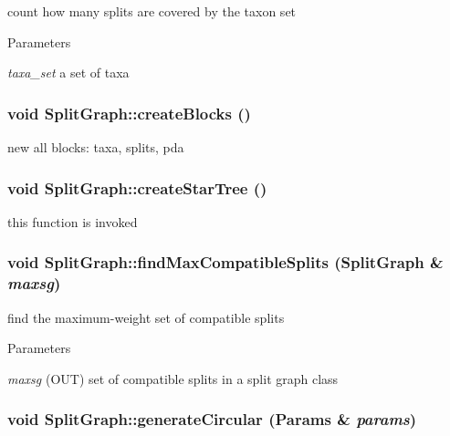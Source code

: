 count how many splits are covered by the taxon set 
\begin{DoxyParams}{Parameters}
\item[{\em taxa\_\-set}]a set of taxa \end{DoxyParams}
\hypertarget{classSplitGraph_a05d34dc9d03a3aed2e195b64acd698b0}{
\subsubsection[{createBlocks}]{\setlength{\rightskip}{0pt plus 5cm}void SplitGraph::createBlocks ()}}
\label{classSplitGraph_a05d34dc9d03a3aed2e195b64acd698b0}
new all blocks: taxa, splits, pda \hypertarget{classSplitGraph_af306b9e7b96b0fc89d664548e2b6769a}{
\subsubsection[{createStarTree}]{\setlength{\rightskip}{0pt plus 5cm}void SplitGraph::createStarTree ()}}
\label{classSplitGraph_af306b9e7b96b0fc89d664548e2b6769a}
this function is invoked \hypertarget{classSplitGraph_a870e02f7034993ce445ab9ae1964a781}{
\subsubsection[{findMaxCompatibleSplits}]{\setlength{\rightskip}{0pt plus 5cm}void SplitGraph::findMaxCompatibleSplits ({\bf SplitGraph} \& {\em maxsg})}}
\label{classSplitGraph_a870e02f7034993ce445ab9ae1964a781}
find the maximum-\/weight set of compatible splits 
\begin{DoxyParams}{Parameters}
\item[{\em maxsg}](OUT) set of compatible splits in a split graph class \end{DoxyParams}
\hypertarget{classSplitGraph_a49e61357ca80dc01cc75891c1316a921}{
\subsubsection[{generateCircular}]{\setlength{\rightskip}{0pt plus 5cm}void SplitGraph::generateCircular ({\bf Params} \& {\em params})}}
